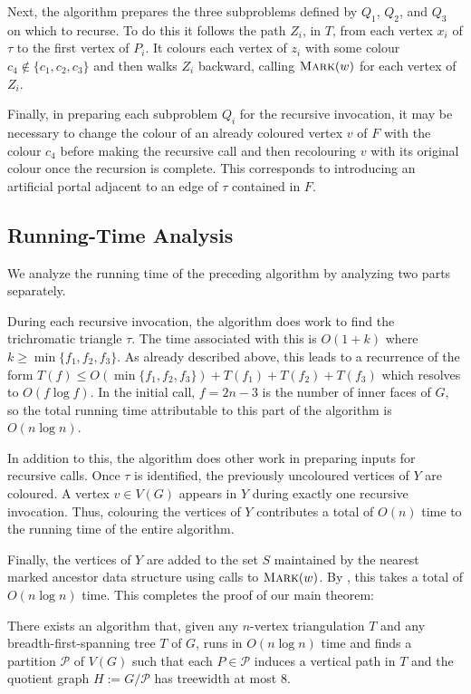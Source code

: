 \documentclass[kpfonts]{patmorin}
\let\le\leqslant
\let\ge\geqslant
\begin{document}
Next, the algorithm prepares the three subproblems defined by $Q_1$, $Q_2$, and $Q_3$ on which to recurse.  To do this it follows the path $Z_i$, in $T$, from each vertex $x_i$ of $\tau$ to the first vertex of $P_i$.  It colours each vertex of $z_i$ with some colour $c_4\not\in\{c_1,c_2,c_3\}$ and then walks $Z_i$ backward, calling $\textsc{Mark}(w)$ for each vertex of $Z_i$.

Finally, in preparing each subproblem $Q_i$ for the recursive invocation, it may be necessary to change the colour of an already coloured vertex $v$ of $F$ with the colour $c_4$ before making the recursive call and then recolouring $v$ with its original colour once the recursion is complete.  This corresponds to introducing an artificial portal adjacent to an edge of $\tau$ contained in $F$.

\subsection{Running-Time Analysis}

We analyze the running time of the preceding algorithm by analyzing two parts separately.

During each recursive invocation, the algorithm does work to find the trichromatic triangle $\tau$.  The time associated with this is $O(1+k)$ where $k\ge \min\{f_1,f_2,f_3\}$.  As already described above, this leads to a recurrence of the form $T(f) \le O(\min\{f_1,f_2,f_3\}) + T(f_1)+T(f_2)+T(f_3)$ which resolves to $O(f\log f)$.  In the initial call, $f=2n-3$ is the number of inner faces of $G$, so the total running time attributable to this part of the algorithm is $O(n\log n)$.

In addition to this, the algorithm does other work in preparing inputs for recursive calls.  Once $\tau$ is identified, the previously uncoloured vertices of $Y$ are coloured.  A vertex $v\in V(G)$ appears in $Y$ during exactly one recursive invocation. Thus, colouring the vertices of $Y$ contributes a total of $O(n)$ time to the running time of the entire algorithm.

Finally, the vertices of $Y$ are added to the set $S$ maintained by the nearest marked ancestor data structure using calls to $\textsc{Mark}(w)$.  By , this takes a total of $O(n\log n)$ time.
This completes the proof of our main theorem:

\begin{thm}
  There exists an algorithm that, given any $n$-vertex triangulation $T$ and any breadth-first-spanning tree $T$ of $G$, runs in $O(n\log n)$ time and finds a partition $\mathcal{P}$ of $V(G)$ such that each $P\in\mathcal{P}$ induces a vertical path in $T$ and the quotient graph $H:=G/\mathcal{P}$ has treewidth at most $8$.
\end{thm}
\end{document}
